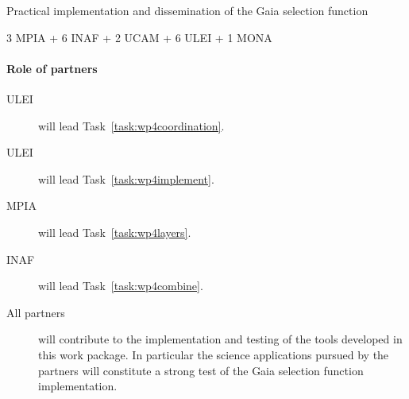 \begin{workpackage}{Practical implementation and dissemination of the Gaia selection function}
\begin{wpdescription}
{      \textsf{3 MPIA + 6 INAF + 2 UCAM + 6 ULEI + 1 MONA \pems}
    }

    \paragraph{Role of partners}
    \begin{description}
      \item[ULEI] will lead Task~\ref{task:wp4coordination}.
      \item[ULEI] will lead Task~\ref{task:wp4implement}.
      \item[MPIA] will lead Task~\ref{task:wp4layers}.
      \item[INAF] will lead Task~\ref{task:wp4combine}.
      \item[All partners] will contribute to the implementation and testing of the tools developed in this work package. In particular the science applications pursued by the partners will constitute a strong test of the Gaia selection function implementation.
    \end{description}
  \end{wpdescription}

  \begin{wpdeliverables}
    \label{dev:wp4webportalv1}
    \label{dev:wp4prototypev1}
    \label{dev:wp4webportalv2}
    \label{dev:wp4prototypev2}
    \label{dev:wp4webportalv3}
    \label{dev:wp4final}
    \label{dev:wp4portal}
  \end{wpdeliverables}

\end{workpackage}



